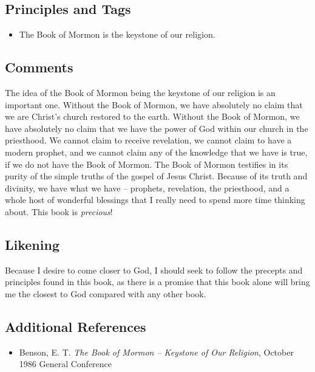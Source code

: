 \documentclass[12pt]{report}
\begin{document}
\subsection{Principles and Tags\label{intro:principles6}}
\begin{itemize}
\item {}The Book of Mormon is the keystone of our religion.
\end{itemize}

\subsection{Comments\label{intro:comments6}}
The idea of the Book of Mormon being the keystone of our religion is an important one.  Without the Book of Mormon, we have absolutely no claim that we are Christ's church restored to the earth.  Without the Book of Mormon, we have absolutely no claim that we have the power of God within our church in the priesthood.  We cannot claim to receive revelation, we cannot claim to have a modern prophet, and we cannot claim any of the knowledge that we have is true, if we do not have the Book of Mormon.  The Book of Mormon testifies in its purity of the simple truths of the gospel of Jesus Christ.  Because of its truth and divinity, we have what we have -- prophets, revelation, the priesthood, and a whole host of wonderful blessings that I really need to spend more time thinking about.  This book is \emph{precious}!

\subsection{Likening\label{intro:likening6}}
Because I desire to come closer to God, I should seek to follow the precepts and principles found in this book, as there is a promise that this book alone will bring me the closest to God compared with any other book.

\subsection{Additional References\label{intro:references6}}
\begin{itemize}
\item Benson, E. T. \emph{The Book of Mormon -- Keystone of Our Religion}, October 1986 General Conference
\end{itemize}
\end{document}

